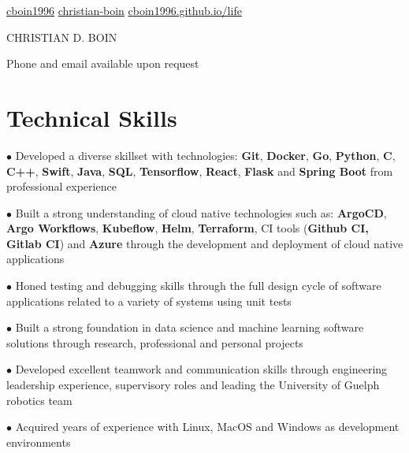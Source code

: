 \documentclass[a4paper,11pt]{article}
\newcommand{\name}{CHRISTIAN D. BOIN} %
\newcommand{\github}{cboin1996} %
\newcommand{\linkedin}{christian-boin-masc-ai-6b705a135} %
\begin{document}
\selectfont


\newcommand{\iconspace}{0.4mm}
\newcommand{\headingsep}{1cm}
\begin{center}
    \small{\href{https://github.com/\github}{\faGithub \hspace{\iconspace} \github} \hspace{\headingsep}
           \href{https://www.linkedin.com/in/\linkedin/}{\faLinkedinSquare \hspace{\iconspace} christian-boin} \hspace{\headingsep}
           \href{https://cboin1996.github.io/life/}{\faFileCodeO \hspace{\iconspace} cboin1996.github.io/life}
    }
\end{center}
\begin{center}
    \vspace{-0.4cm}
    \huge{{\name}}
\end{center}
\begin{center}
    \vspace{-0.2cm}
    \tiny{
        Phone and email available upon request
    }
\end{center}
\section{Technical Skills}
\resumeItemListStart
\item[$\bullet$] Developed a diverse skillset with technologies: \textbf{Git}, \textbf{Docker}, \textbf{Go},
\textbf{Python}, \textbf{C}, \textbf{C++}, \textbf{Swift}, \textbf{Java}, \textbf{SQL}, \textbf{Tensorflow}, \textbf{React},
\textbf{Flask} and \textbf{Spring Boot} from professional experience
\item[$\bullet$] Built a strong understanding of cloud native technologies such as: \textbf{ArgoCD}, \textbf{Argo Workflows},
\textbf{Kubeflow}, \textbf{Helm},
\textbf{Terraform}, CI tools (\textbf{Github CI, Gitlab CI}) and \textbf{Azure} through the development and deployment
of cloud native applications
\item[$\bullet$] Honed testing and debugging skills through the full design cycle of software applications related
to a variety of systems using unit tests
\item[$\bullet$] Built a strong foundation in data science and machine learning software solutions through
research, professional and personal projects
\item[$\bullet$] Developed excellent teamwork and communication skills through engineering leadership experience,
supervisory roles and leading the University of Guelph robotics team
\item[$\bullet$] Acquired years of experience with Linux, MacOS and Windows as development environments
\resumeItemListEnd
\end{document}
